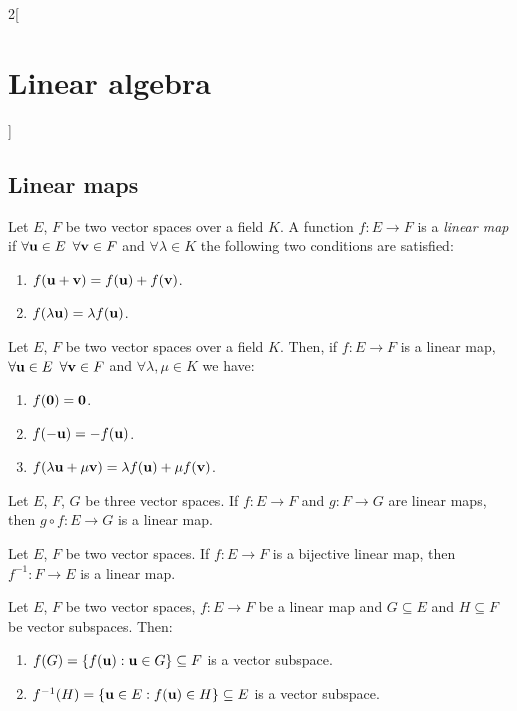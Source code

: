 \documentclass[../../../main.tex]{subfiles}
\begin{document}
\begin{multicols}{2}[\section{Linear algebra}]
\subsection{Linear maps}
\begin{definition}
    Let $E$, $F$ be two vector spaces over a field $K$. A function $f:E\rightarrow F$ is a \textit{linear map} if $\forall\vb{u}\in E$ $\forall\vb{v}\in F$ and $\forall\lambda\in K$ the following two conditions are satisfied:
    \begin{enumerate}
        \item $f(\vb{u}+\vb{v})=f(\vb{u})+f(\vb{v})$.
        \item $f(\lambda \vb{u})=\lambda f(\vb{u})$.
    \end{enumerate}
\end{definition}
\begin{prop}
    Let $E$, $F$ be two vector spaces over a field $K$. Then, if $f:E\rightarrow F$ is a linear map, $\forall\vb{u}\in E$ $\forall\vb{v}\in F$ and $\forall\lambda,\mu\in K$ we have:
    \begin{enumerate}
        \item $f(\vb{0})=\vb{0}$.
        \item $f(-\vb{u})=-f(\vb{u})$.
        \item $f(\lambda\vb{u}+\mu\vb{v})=\lambda f(\vb{u})+\mu f(\vb{v})$.
    \end{enumerate}
\end{prop}
\begin{prop}
    Let $E$, $F$, $G$ be three vector spaces. If $f:E\rightarrow F$ and $g:F\rightarrow G$ are linear maps, then $g\circ f:E\rightarrow G$ is a linear map.
\end{prop}
\begin{prop}
    Let $E$, $F$ be two vector spaces. If $f:E\rightarrow F$ is a bijective linear map, then $f^{-1}:F\rightarrow E$ is a linear map.
\end{prop}
\begin{prop}
    Let $E$, $F$ be two vector spaces, $f:E\rightarrow F$ be a linear map and $G\subseteq E$ and $H\subseteq F$ be vector subspaces. Then:
    \begin{enumerate}
        \item $f(G)=\{f(\vb{u}): \vb{u}\in G\}\subseteq F$ is a vector subspace.
        \item $f^{-1}(H)=\{\vb{u}\in E: f(\vb{u})\in H\}\subseteq E$ is a vector subspace.

\end{enumerate}
\end{prop}
\end{multicols}
\end{document}
